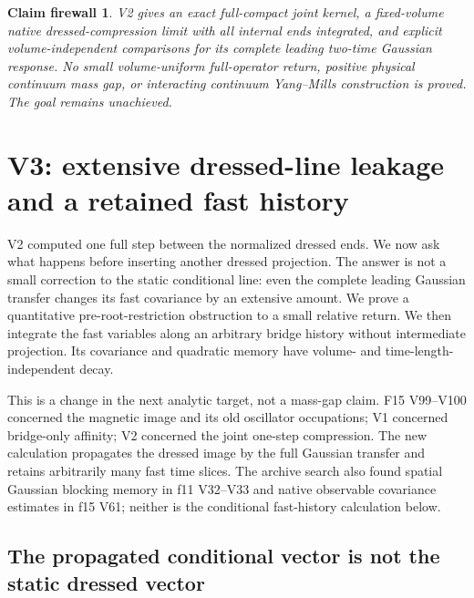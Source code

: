 \documentclass[11pt,oneside]{article}
\newtheorem{firewall}[theorem]{Claim firewall}
\begin{document}
\begin{firewall}
V2 gives an exact full-compact joint kernel, a fixed-volume
native dressed-compression limit with all internal ends
integrated, and explicit volume-independent comparisons for
its complete leading two-time Gaussian response.
No small volume-uniform full-operator return, positive
physical continuum mass gap, or interacting continuum
Yang--Mills construction is proved. The goal remains unachieved.
\end{firewall}

\section{V3: extensive dressed-line leakage and a retained fast history}
\label{f16v3:context}

V2 computed one full step between the normalized dressed ends.
We now ask what happens before inserting another dressed projection.
The answer is not a small correction to the static conditional line:
even the complete leading Gaussian transfer changes its fast
covariance by an extensive amount. We prove a quantitative
pre-root-restriction obstruction to a small relative return.
We then integrate the fast variables along an arbitrary bridge
history without intermediate projection. Its covariance and
quadratic memory have volume- and time-length-independent decay.

This is a change in the next analytic target, not a mass-gap claim.
F15 V99--V100 concerned the magnetic image and its old oscillator
occupations; V1 concerned bridge-only affinity; V2 concerned the
joint one-step compression. The new calculation propagates the
dressed image by the full Gaussian transfer and retains arbitrarily
many fast time slices. The archive search also found spatial
Gaussian blocking memory in f11 V32--V33 and native observable
covariance estimates in f15 V61; neither is the conditional
fast-history calculation below.

\subsection{The propagated conditional vector is not the static dressed vector}
\end{document}
